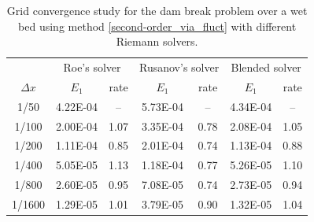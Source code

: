 \documentclass[preprint, 11pt]{article}
\begin{document}
\begin{table}[!ht]\scriptsize
  \begin{center}
    \begin{tabular}{||c||c|c||c|c||c|c||} \hline
      & \multicolumn{2}{c||}{Roe's solver}  
      &\multicolumn{2}{c||}{Rusanov's solver} 
      &\multicolumn{2}{c||}{Blended solver} \\ \cline{2-7}
      $\Delta x$ & $E_1$ & rate & $E_1$ & rate & $E_1$ & rate \\ \hline
      1/50   & 4.22E-04 &  --  & 5.73E-04 &  --  & 4.34E-04 & --   \\
      1/100  & 2.00E-04 & 1.07 & 3.35E-04 & 0.78 & 2.08E-04 & 1.05 \\
      1/200  & 1.11E-04 & 0.85 & 2.01E-04 & 0.74 & 1.13E-04 & 0.88 \\
      1/400  & 5.05E-05 & 1.13 & 1.18E-04 & 0.77 & 5.26E-05 & 1.10 \\
      1/800  & 2.60E-05 & 0.95 & 7.08E-05 & 0.74 & 2.73E-05 & 0.94 \\
      1/1600 & 1.29E-05 & 1.01 & 3.79E-05 & 0.90 & 1.32E-05 & 1.04 \\ \hline
    \end{tabular}
    \caption{Grid convergence study for the dam break problem over a wet bed
      using method \eqref{second-order_via_fluct} with different Riemann solvers.\label{table:rp_wet_bed}}
  \end{center}
\end{table}
\end{document}
